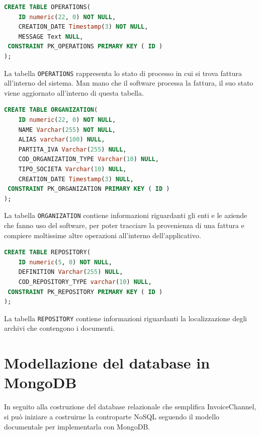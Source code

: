 \begin{lstlisting}[language=SQL,
        deletekeywords={IDENTITY,INT},
        morekeywords={clustered},    
        framesep=10pt,
        framextopmargin=10pt, style=sql_style]
CREATE TABLE OPERATIONS(
    ID numeric(22, 0) NOT NULL,
    CREATION_DATE Timestamp(3) NOT NULL,
    MESSAGE Text NULL,
 CONSTRAINT PK_OPERATIONS PRIMARY KEY ( ID )
);
\end{lstlisting}
\noindent La tabella \texttt{OPERATIONS} rappresenta lo stato di processo in cui si trova fattura all'interno del sistema. Man mano che il software processa la fattura, il suo stato viene aggiornato all'interno di questa tabella.\\

\begin{lstlisting}[language=SQL,
        deletekeywords={IDENTITY,INT},
        morekeywords={clustered},    
        framesep=10pt,
        framextopmargin=10pt, style=sql_style]
CREATE TABLE ORGANIZATION(
    ID numeric(22, 0) NOT NULL,
    NAME Varchar(255) NOT NULL,
    ALIAS varchar(100) NULL,
    PARTITA_IVA Varchar(255) NULL,
    COD_ORGANIZATION_TYPE Varchar(10) NULL,
    TIPO_SOCIETA Varchar(10) NULL,
    CREATION_DATE Timestamp(3) NULL,
 CONSTRAINT PK_ORGANIZATION PRIMARY KEY ( ID )
);
\end{lstlisting}
\noindent La tabella \texttt{ORGANIZATION} contiene informazioni riguardanti gli enti e le aziende che fanno uso del software, per poter tracciare la provenienza di una fattura e compiere moltissime altre operazioni all'interno dell'applicativo.\\

\begin{lstlisting}[language=SQL,
        deletekeywords={IDENTITY,INT},
        morekeywords={clustered},    
        framesep=10pt,
        framextopmargin=10pt, style=sql_style]
CREATE TABLE REPOSITORY(
    ID numeric(5, 0) NOT NULL,
    DEFINITION Varchar(255) NULL,
    COD_REPOSITORY_TYPE varchar(10) NULL,
 CONSTRAINT PK_REPOSITORY PRIMARY KEY ( ID )
);
\end{lstlisting}
\noindent La tabella \texttt{REPOSITORY} contiene informazioni riguardanti la localizzazione degli archivi che contengono i documenti. \\


\section{Modellazione del database in MongoDB}
In seguito alla costruzione del database relazionale che semplifica InvoiceChannel, si può iniziare a costruirne la controparte NoSQL seguendo il modello documentale per implementarla con MongoDB.\\

